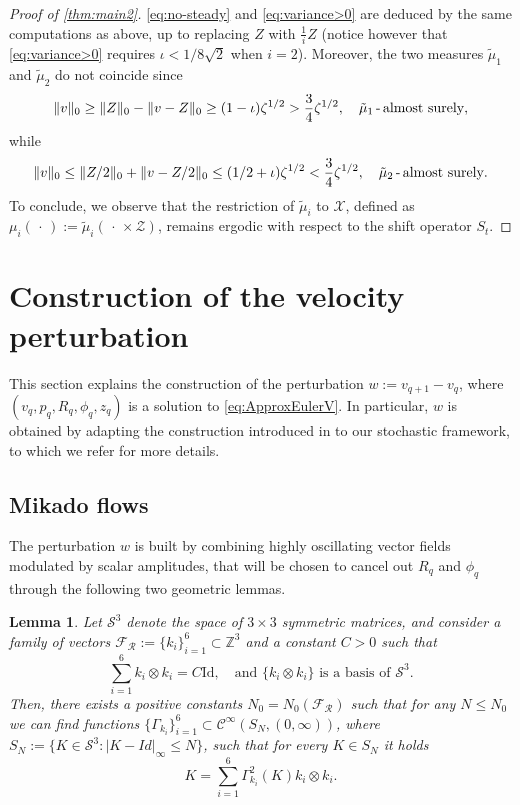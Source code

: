 \documentclass[10pt,a4paper]{amsart}
\numberwithin{equation}{section}
\numberwithin{corollario}{section}
\newtheorem{lemma}{Lemma}
\numberwithin{lemma}{section}
\numberwithin{prop}{section}
\theoremstyle{definition}
\theoremstyle{remark}
\newcommand{\Z}{\mathbb{Z}}
\newcommand{\C}{\mathscr{C}}
\newcommand{\Id}{\mathrm{Id}}
\newcommand{\ktimes}{k_i \otimes k_i}
\newcommand{\gammai}{\Gamma_{k_i}}
\newcommand{\qq}{_{q+1}}
\begin{document}
\begin{proof}[Proof of \autoref{thm:main2}]
\eqref{eq:no-steady} and \eqref{eq:variance>0} are deduced by the same computations as above, up to replacing $Z$ with $\frac1i Z$ (notice however that \eqref{eq:variance>0} requires $\iota < 1/8\sqrt{2}$ when $i=2$). Moreover, the two measures $\tilde\mu_1$ and $\tilde\mu_2$ do not coincide since
\begin{align}
    \| v \|_0 \geq \|Z\|_0-\|v - Z\|_0 \geq (1-\iota) \zeta^{1/2} > \frac34 \zeta^{1/2},
    \quad
    \tilde\mu_1 \, \mbox{-\,almost surely},
\end{align}
while 
\begin{align}
    \| v \|_0 \leq \|Z/2\|_0 +\|v - Z/2\|_0 \leq (1/2+\iota) \zeta^{1/2} < \frac34 \zeta^{1/2},
    \quad
    \tilde\mu_2 \, \mbox{-\,almost surely}.
\end{align}
To conclude, we observe that the restriction of $\tilde\mu_i$ to $\mathscr{X}$, defined as $\mu_i(\,\cdot\,) := \tilde\mu_i(\,\cdot \,\times \mathscr{Z})$, remains ergodic with respect to the shift operator $S_t$.

\end{proof}


\section{Construction of the velocity perturbation} \label{sec:velocity}
This section explains the construction of the perturbation $w:=v\qq-v_{q}$, where $(v_q,p_q,R_q, \phi_q,z_q)$ is a solution to \eqref{eq:ApproxEulerV}. In particular, $w$ is obtained by adapting the construction introduced in \cite{DLK23} to our stochastic framework, to which we refer for more details.

\subsection{Mikado flows} \label{ssec:mikado}
 The perturbation $w$ is built by combining highly oscillating vector fields modulated by scalar amplitudes, that will be chosen to cancel out $R_q$ and $\phi_q$ through the following two geometric lemmas.

\begin{lemma}%
\label{GeomLemma1}
Let $\mathcal{S}^3$ denote the space of $3 \times 3$ symmetric matrices, and consider a family of vectors $\mathcal{F_{R}}:=\{k_i\}_{i=1}^6\subset \Z^3$ and a constant $C>0$ such that
 \begin{equation}
     \sum\limits_{i=1}^6\ktimes=C\Id,\quad\text{and } \{k_i\otimes k_i\}\text{ is a basis of }\mathcal{S}^3.
 \end{equation}
 Then, there exists a positive constants $N_0=N_0(\mathcal{F_{R}})$ such that for any $N\le N_0$ we can find functions $\{\gammai\}_{i=1}^6 \subset \C^{\infty}(S_N,(0,\infty))$, where $S_N:=\{
 K \in \mathcal{S}^3 :  |K-Id|_{\infty}\le N\}$, such that for every $K \in S_N$ it holds
 \begin{equation}\label{RapprFormMatrix}
     K=\sum\limits_{i=1}^6\gammai^2(K)\ktimes.
 \end{equation}
\end{lemma}
\end{document}
